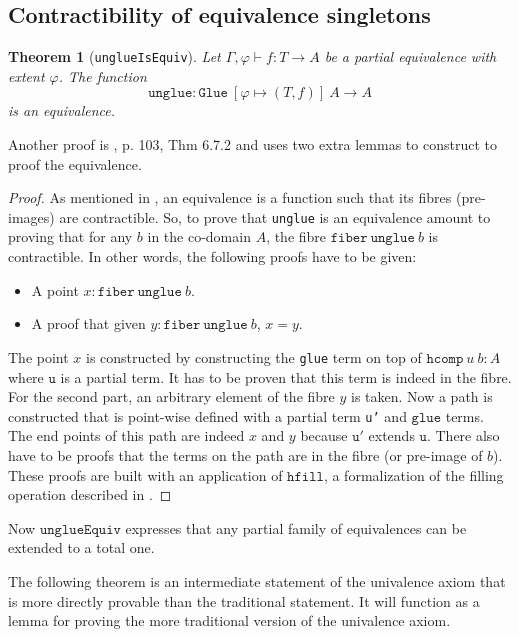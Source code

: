 \documentclass[12pt,a4paper,twoside,xetex]{book} %
\newtheorem{theorem}{Theorem}[section]
\newcommand{\op}[1]{\mathtt{#1}}
\begin{document}
\subsection{Contractibility of equivalence singletons}

\begin{theorem}[\texttt{unglueIsEquiv}]
Let $\Gamma, \varphi \vdash f : T \rightarrow A$ be a partial equivalence with 
extent $\varphi$. The function $$ \op{unglue} : \op{Glue} \ \left[\varphi 
\mapsto (T,f) \right] \ A \rightarrow A$$ is an equivalence. 
\end{theorem}

Another proof is \cite{Huber2016}, p. 103, Thm 6.7.2 and uses two extra 
lemmas to construct to proof the equivalence.

\begin{proof}
As mentioned in , an equivalence is a function such 
that its fibres (pre-images) are contractible. So, to prove that 
\texttt{unglue} is an equivalence amount to proving that for any $b$ in the 
co-domain $A$, the fibre $\op{fiber}\ \op{unglue} \ b$ is contractible. In 
other words, the following proofs have to be given:
\begin{itemize}
\item A point  $x : \op{fiber}\ \op{unglue} \ b$. 
\item A proof that given $y : \op{fiber}\ \op{unglue} \ b$, $x = y$. 
\end{itemize}
The point $x$ is constructed by constructing the \texttt{glue} term on top of 
$\texttt{hcomp} \ u \ b : A$ where $\op{u}$ is a partial term. It has to be 
proven that this term is indeed in the fibre. For the second part, an arbitrary 
element of the fibre $y$ is taken. Now a path is constructed that is point-wise 
defined with a partial term \texttt{u'} and $\op{glue}$ terms. The end points 
of this path are indeed $x$ and $y$ because $\op{u'}$ extends $\op{u}$. There 
also have to be proofs that the terms on the path are in the fibre (or 
pre-image of $b$). These proofs are built with an application of $\op{hfill}$, 
a formalization of the filling operation described in .
\end{proof}

Now $\op{unglueEquiv}$  expresses that any partial family of equivalences can 
be extended to a total one.

The following theorem is an intermediate statement of the univalence axiom that 
is more directly provable than the traditional statement. It will function as a 
lemma for proving the more traditional version of the univalence axiom.
\end{document}
